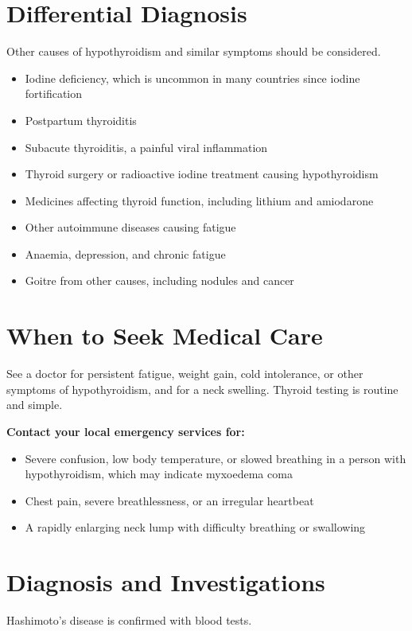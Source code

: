 \section*{Differential Diagnosis}
Other causes of hypothyroidism and similar symptoms should be considered.

\begin{itemize}
    \item Iodine deficiency, which is uncommon in many countries since iodine fortification
    \item Postpartum thyroiditis
    \item Subacute thyroiditis, a painful viral inflammation
    \item Thyroid surgery or radioactive iodine treatment causing hypothyroidism
    \item Medicines affecting thyroid function, including lithium and amiodarone
    \item Other autoimmune diseases causing fatigue
    \item Anaemia, depression, and chronic fatigue
    \item Goitre from other causes, including nodules and cancer
\end{itemize}

\section*{When to Seek Medical Care}
See a doctor for persistent fatigue, weight gain, cold intolerance, or other symptoms of hypothyroidism, and for a neck swelling. Thyroid testing is routine and simple.

\textbf{Contact your local emergency services for:}
\begin{itemize}
    \item Severe confusion, low body temperature, or slowed breathing in a person with hypothyroidism, which may indicate myxoedema coma
    \item Chest pain, severe breathlessness, or an irregular heartbeat
    \item A rapidly enlarging neck lump with difficulty breathing or swallowing
\end{itemize}

\section*{Diagnosis and Investigations}
Hashimoto's disease is confirmed with blood tests.

